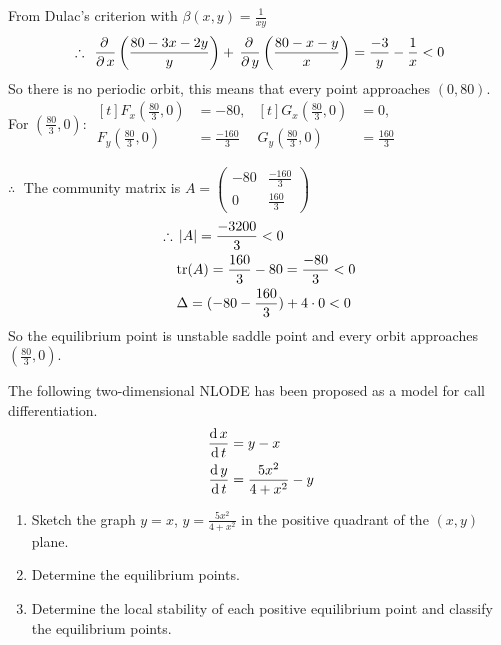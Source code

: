 \documentclass[../main-sheet.tex]{subfiles}
\begin{document}
\begin{soln}
    From Dulac's criterion with \(\beta(x,y)=\frac{1}{xy}\)\\
    \[\therefore\; \,\frac{\partial\, }{\partial\, x}\left( \frac{80-3x-2y}{y} \right)+\,\frac{\partial\, }{\partial\, y}\left( \frac{80-x-y}{x} \right)=\frac{-3}{y}-\frac{1}{x}<0\]
    So there is no periodic orbit, this means that every point approaches \((0,80)\).\\
    
    
    For \((\frac{80}{3},0)\): \(\begin{aligned}[t]
        F_x(\frac{80}{3},0)&=-80,\\
        F_y(\frac{80}{3},0)&=\frac{-160}{3}
    \end{aligned}\)\hspace{1cm}\(\begin{aligned}[t]
        G_x(\frac{80}{3},0)&=0,\\
        G_y(\frac{80}{3},0)&=\frac{160}{3}
    \end{aligned}\)


    \(\therefore\;\) The community matrix is \(A=\begin{pmatrix}
        -80&\frac{-160}{3}\\
        0&\frac{160}{3}
    \end{pmatrix}\)
    \begin{align*}
        \therefore\;&\left\vert A\right\vert=\frac{-3200}{3}<0\\
        &\text{tr}(A)=\frac{160}{3}-80=\frac{-80}{3}<0\\
        &\Delta =(-80-\frac{160}{3})+4\cdot0<0
    \end{align*}
    So the equilibrium point is unstable saddle point and every orbit approaches \((\frac{80}{3},0)\).
\end{soln}
\begin{prob}
    The following two-dimensional NLODE has been proposed as a model for call differentiation.
    \begin{align*}
        \,\frac{\mathrm{d}\,x}{\mathrm{d}\,t}&=y-x\\
        \,\frac{\mathrm{d}\,y}{\mathrm{d}\,t}&=\frac{5x^2}{4+x^2}-y
    \end{align*}
    \begin{enumerate}[label=(\roman*)]
        \item Sketch the graph \(y=x\), \(y=\frac{5x^2}{4+x^2}\) in the positive quadrant of the \((x,y)\) plane.
        \item Determine the equilibrium points.
        \item Determine the local stability of each positive equilibrium point and classify the equilibrium points.
    \end{enumerate}
\end{prob}
\end{document}
